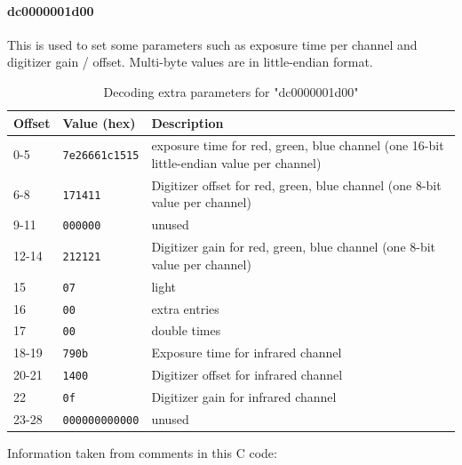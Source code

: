 \documentclass{article}
\begin{document}
\paragraph{dc0000001d00} This is used to set some parameters such as exposure time
per channel and digitizer gain / offset. Multi-byte
values are in little-endian format.

\begin{table}[H]
  \caption{Decoding extra parameters for "dc0000001d00"}
  \centering
  \begin{tabular}{p{1cm} | p{2.5cm} | p{7cm}}
    Offset & Value (hex) & Description \\ \hline
    0-5 & {\tt 7e26661c1515} & exposure time for red, green, blue channel
                               (one 16-bit little-endian value per channel) \\
    6-8 & {\tt 171411} & Digitizer offset for red, green, blue channel
                               (one 8-bit value per channel) \\
    9-11 & {\tt 000000} & unused \\
    12-14 & {\tt 212121} & Digitizer gain for red, green, blue channel
                               (one 8-bit value per channel) \\
    15 & {\tt 07} & light \\
    16 & {\tt 00} & extra entries \\
    17 & {\tt 00} & double times \\
    18-19 & {\tt 790b} & Exposure time for infrared channel \\
    20-21 & {\tt 1400} & Digitizer offset for infrared channel \\
    22 & {\tt 0f} & Digitizer gain for infrared channel \\
    23-28 & {\tt 000000000000} & unused \\
  \end{tabular}
  
  \vspace{5mm}
  Information taken from comments in this C code: \cite[\texttt{pieusb\_scancmd.c}]{sane_code}
  \label{table:paramdc}
\end{table}
\end{document}
